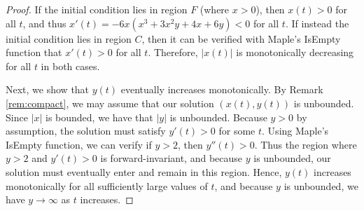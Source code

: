 \documentclass[10pt,a4paper]{amsart}
\begin{document}
    \begin{proof}
        If the initial condition lies in region $F$ (where $x>0$), then $x(t)>0$ for all $t$, and thus $x'(t) = -6x\left(x^3 + 3x^2 y + 4x + 6y\right)<0$ for all $t$.
        If instead the initial condition lies in region $C$, then it can be verified with Maple's IsEmpty function that $x'(t)>0$ for all $t$.
        Therefore, $|x(t)|$ is monotonically decreasing for all $t$ in both cases.
        
        Next, we show that $y(t)$ eventually increases monotonically.
        By Remark \ref{rem:compact}, we may assume that our solution $(x(t),y(t))$ is unbounded.
        Since $|x|$ is bounded, we have that $|y|$ is unbounded.  
        Because $y>0$ by assumption, the solution must satisfy $y'(t) > 0$ for some $t$.  
        Using Maple's IsEmpty function, we can verify if $y>2$, then $y''(t)>0$.
        Thus the region where $y>2$ and $y'(t)>0$ is forward-invariant, and because $y$ is unbounded, our solution must eventually enter and remain in this region.
        Hence, $y(t)$ increases monotonically for all sufficiently large values of $t$, and because $y$ is unbounded, we have $y\to \infty$ as $t$ increases.
        
        




\end{proof}
\end{document}

